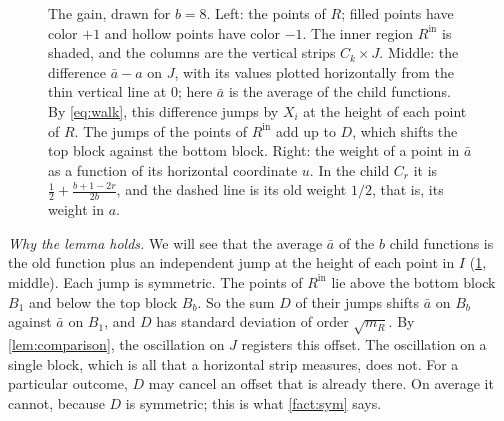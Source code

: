 \documentclass[11pt,letterpaper]{article}
\newcommand{\1}{\mathbf{1}}
\newcommand{\Rin}{R^{\mathrm{in}}}
\begin{document}
\begin{figure}[t]
\caption{The gain, drawn for $b=8$. Left: the points of $R$; filled points have color $+1$ and hollow points have color $-1$. The inner region $\Rin$ is shaded, and the columns are the vertical strips $C_k\times J$. Middle: the difference $\bar a-a$ on $J$, with its values plotted horizontally from the thin vertical line at $0$; here $\bar a$ is the average of the child functions. By \eqref{eq:walk}, this difference jumps by $X_i$ at the height of each point of $R$. The jumps of the points of $\Rin$ add up to $D$, which shifts the top block against the bottom block. Right: the weight of a point in $\bar a$ as a function of its horizontal coordinate $u$. In the child $C_r$ it is $\frac12+\frac{b+1-2r}{2b}$, and the dashed line is its old weight $1/2$, that is, its weight in $a$.}
\label{fig:gain}
\end{figure}

\emph{Why the lemma holds.} We will see that the average $\bar a$ of the $b$ child functions is the old function plus an independent jump at the height of each point in $I$ (\cref{fig:gain}, middle). Each jump is symmetric. The points of $\Rin$ lie above the bottom block $B_1$ and below the top block $B_b$. So the sum $D$ of their jumps shifts $\bar a$ on $B_b$ against $\bar a$ on $B_1$, and $D$ has standard deviation of order $\sqrt{m_R}$. By \cref{lem:comparison}, the oscillation on $J$ registers this offset. The oscillation on a single block, which is all that a horizontal strip measures, does not. For a particular outcome, $D$ may cancel an offset that is already there. On average it cannot, because $D$ is symmetric; this is what \cref{fact:sym} says.
\end{document}
